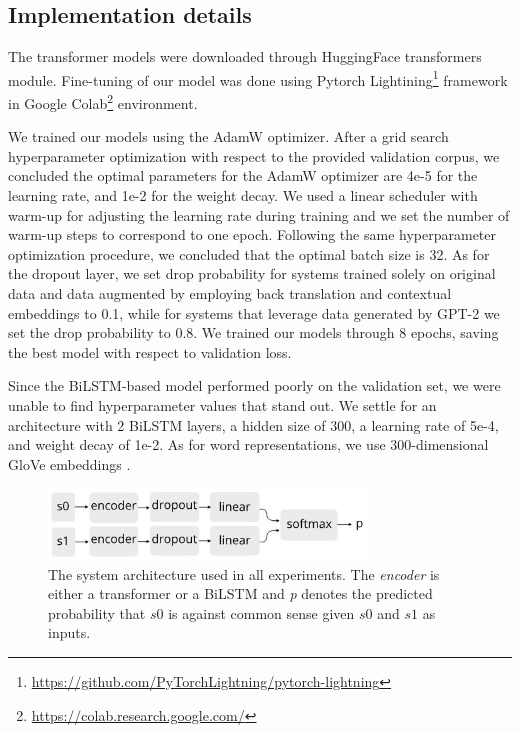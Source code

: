 \documentclass[10pt, a4paper]{article}
\begin{document}
\subsection{Implementation details}

The transformer models were downloaded through HuggingFace transformers \citep{wolf-etal-2020-transformers} module. Fine-tuning of our model was done using Pytorch Lightining\footnote{\href{https://github.com/PyTorchLightning/pytorch-lightning}{https://github.com/PyTorchLightning/pytorch-lightning}} framework in Google Colab\footnote{\href{https://colab.research.google.com/}{https://colab.research.google.com/}} environment.

We trained our models using the AdamW optimizer. After a grid search hyperparameter optimization with respect to the provided validation corpus, we concluded the optimal parameters for the AdamW optimizer are 4e-5 for the learning rate, and 1e-2 for the weight decay. We used a linear scheduler with warm-up for adjusting the learning rate during training and we set the number of warm-up steps to correspond to one epoch. Following the same hyperparameter optimization procedure, we concluded that the optimal batch size is 32. As for the dropout layer, we set drop probability for systems trained solely on original data and data augmented by employing back translation and contextual embeddings to 0.1, while for systems that leverage data generated by GPT-2 we set the drop probability to 0.8. We trained our models through 8 epochs, saving the best model with respect to validation loss.

Since the BiLSTM-based model performed poorly on the validation set, we were unable to find hyperparameter values that stand out. We settle for an architecture with 2 BiLSTM layers, a hidden size of 300, a learning rate of 5e-4, and weight decay of 1e-2. As for word representations, we use 300-dimensional GloVe embeddings \citep{pennington2014glove}.


\begin{figure} 
    \centering
    \includegraphics[width=8.5cm]{images/model14.jpg}
    \caption{The system architecture used in all experiments. The \textit{encoder} is either a transformer or a BiLSTM and \textit{p} denotes the predicted probability that $s0$ is against common sense given $s0$ and $s1$ as inputs.}
    \label{fig:model}
\end{figure}
\end{document}
